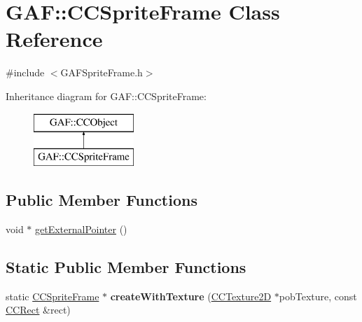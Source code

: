 \hypertarget{class_g_a_f_1_1_c_c_sprite_frame}{\section{G\-A\-F\-:\-:C\-C\-Sprite\-Frame Class Reference}
\label{class_g_a_f_1_1_c_c_sprite_frame}
}


{\ttfamily \#include $<$G\-A\-F\-Sprite\-Frame.\-h$>$}

Inheritance diagram for G\-A\-F\-:\-:C\-C\-Sprite\-Frame\-:\begin{figure}[H]
\begin{center}
\leavevmode
\includegraphics[height=2.000000cm]{class_g_a_f_1_1_c_c_sprite_frame}
\end{center}
\end{figure}
\subsection*{Public Member Functions}
\begin{DoxyCompactItemize}
\item 
void $\ast$ \hyperlink{class_g_a_f_1_1_c_c_sprite_frame_affaa9cf5921fd3ee39eed8e383948f87}{get\-External\-Pointer} ()
\end{DoxyCompactItemize}
\subsection*{Static Public Member Functions}
\begin{DoxyCompactItemize}
\item 
\hypertarget{class_g_a_f_1_1_c_c_sprite_frame_a64a7fb555d51aa998b64524e5e62433c}{static \hyperlink{class_g_a_f_1_1_c_c_sprite_frame}{C\-C\-Sprite\-Frame} $\ast$ {\bfseries create\-With\-Texture} (\hyperlink{class_g_a_f_1_1_c_c_texture2_d}{C\-C\-Texture2\-D} $\ast$pob\-Texture, const \hyperlink{class_g_a_f_1_1_c_c_rect}{C\-C\-Rect} \&rect)}\label{class_g_a_f_1_1_c_c_sprite_frame_a64a7fb555d51aa998b64524e5e62433c}

\end{DoxyCompactItemize}


